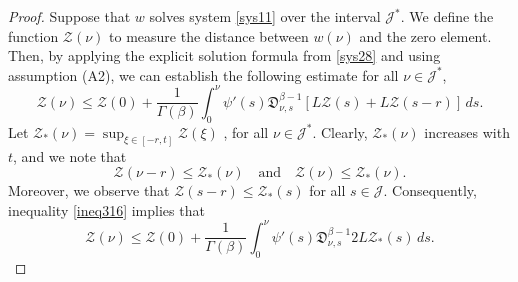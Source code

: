 \documentclass[reqno]{amsart}
\begin{document}
\begin{proof}
Suppose that \( w \) solves system \eqref{sys11} over the interval
\( \mathcal{J}^{*} \). We define the function \( \mathcal{Z}(\nu ) \) to measure 
the distance between \( w(\nu ) \) and the zero element. 
Then, by applying the explicit solution formula from \eqref{sys28} and using 
assumption (A2), we can establish the following estimate for 
all \( \nu \in \mathcal{J}^{*} \),
\begin{equation}\label{ineq316}
\mathcal{Z}(\nu ) \leq \mathcal{Z}(0)+\frac{1}{\Gamma(\beta)} 
\int_0^{\nu } \psi'(s)\mathfrak{D}_{\nu ,s}^{\beta-1}[ L \mathcal{Z}(s)
+ L \mathcal{Z}(s- r)]\,ds. 
\end{equation}
Let $\mathcal{Z}_{*}(\nu )=\sup _{\xi \in[- r, t]} \mathcal{Z}(\xi)$ , 
for all $\nu \in\mathcal{J}^{*}$. Clearly, \( \mathcal{Z}_{*}(\nu ) \) increases with 
\( t \), and we note that
\begin{equation}\label{ineq317}
\mathcal{Z}(\nu - r) \leq \mathcal{Z}_{*}(\nu ) \quad\text{and}\quad
\mathcal{Z}(\nu ) \leq \mathcal{Z}_{*}(\nu ). 
\end{equation}
Moreover, we observe that \( \mathcal{Z}(s - r) \leq \mathcal{Z}_{*}(s) \) 
for all \( s \in \mathcal{J} \). Consequently, inequality \eqref{ineq316} implies 
that
\begin{equation}\label{ineq318}
\mathcal{Z}(\nu ) \leq \mathcal{Z}(0)+\frac{1}{\Gamma(\beta)} 
\int_0^{\nu } \psi'(s)\mathfrak{D}_{\nu ,s}^{\beta-1}2 L \mathcal{Z}_{*}(s)\,ds .
\end{equation}


\end{proof}
\end{document}
